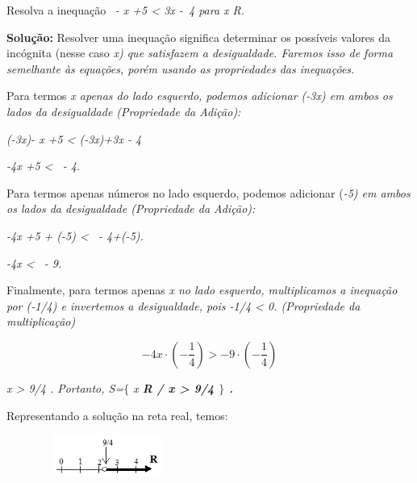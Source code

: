 \begin{texemplo}
Resolva a inequação~ \textit{- x +5 < 3x -~4  para x  R.}

\textbf{Solução:} Resolver uma inequação significa determinar os possíveis valores da incógnita (nesse caso \textit{x) que satisfazem a desigualdade. Faremos isso de forma semelhante às equações, porém usando as propriedades das inequações.}

Para termos \textit{x apenas do lado esquerdo, podemos adicionar (-3x) em ambos os lados da desigualdade (Propriedade da Adição):}

\textit{(-3x)- x +5 < (-3x)+3x - 4}

\textit{-4x +5 <~ - 4.}

Para termos apenas números no lado esquerdo, podemos adicionar (\textit{-5) em ambos os lados da desigualdade (Propriedade da Adição):}

\textit{-4x +5 + (-5) <~ - 4+(-5).}

\textit{-4x  <~ - 9.}

Finalmente, para termos apenas \textit{x no lado esquerdo, multiplicamos a inequação por (-1/4) e invertemos a desigualdade, pois -1/4 < 0. (Propriedade da multiplicação)}

 \[  \]  \[ -4x \cdot  \left( -\frac{1}{4} \right) > -9 \cdot  \left( -\frac{1}{4} \right)  \] 

\textit{x > 9/4 . Portanto, S=$ \{ $ x  \textbf{R / x > 9/4 $ \} $ .}}

Representando a solução na reta real, temos:\textit{}

\begin{figure}[H]
	\centering
		\includegraphics[width=1.77in,height=0.54in]{capitulos/inequacoes/media/image2.png}\qedsymbol{}
\end{figure}
\end{texemplo}


